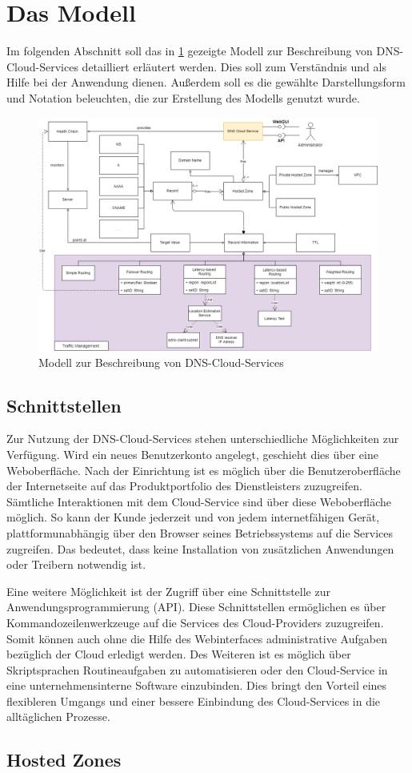 \section{Das Modell}
Im folgenden Abschnitt soll das in \ref{fig:ccmodel} gezeigte Modell zur Beschreibung von DNS-Cloud-Services detailliert erläutert werden. Dies soll zum Verständnis und als Hilfe bei der Anwendung dienen. Außerdem soll es die gewählte Darstellungsform und Notation beleuchten, die zur Erstellung des Modells genutzt wurde.

\begin{figure}
    \includegraphics[width=\textwidth]{images/cc_modelxml.png}
    \caption{Modell zur Beschreibung von DNS-Cloud-Services}
    \label{fig:ccmodel}
\end{figure}

\subsection{Schnittstellen}
Zur Nutzung der DNS-Cloud-Services stehen unterschiedliche Möglichkeiten zur Verfügung. Wird ein neues Benutzerkonto angelegt, geschieht dies über eine Weboberfläche. Nach der Einrichtung ist es möglich über die Benutzeroberfläche der Internetseite auf das Produktportfolio des Dienstleisters zuzugreifen. Sämtliche Interaktionen mit dem Cloud-Service sind über diese Weboberfläche möglich. So kann der Kunde jederzeit und von jedem internetfähigen Gerät, plattformunabhängig über den Browser seines Betriebssystems auf die Services zugreifen. Das bedeutet, dass keine Installation von zusätzlichen Anwendungen oder Treibern notwendig ist.

Eine weitere Möglichkeit ist der Zugriff über eine Schnittstelle zur Anwendungsprogrammierung (API). Diese Schnittstellen ermöglichen es über Kommandozeilenwerkzeuge auf die Services des Cloud-Providers zuzugreifen. Somit können auch ohne die Hilfe des Webinterfaces  administrative Aufgaben bezüglich der Cloud erledigt werden. Des Weiteren ist es möglich über Skriptsprachen Routineaufgaben zu automatisieren oder den Cloud-Service in eine unternehmensinterne Software einzubinden. Dies bringt den Vorteil eines flexibleren Umgangs und einer bessere Einbindung des Cloud-Services in die alltäglichen Prozesse.

 \subsection{Hosted Zones}
 
